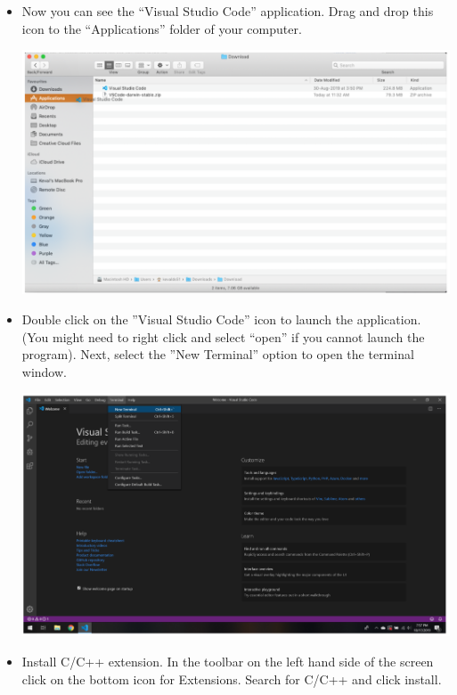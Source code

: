 \begin{itemize}
    \item Now you can see the “Visual Studio Code” application. Drag and drop this icon to the “Applications” folder of your computer. 

    \includegraphics[width=6in]{images/macVSCodeSetup/image4.png}

    \item Double click on the ”Visual Studio Code” icon to launch the application. (You might need to right click and select “open” if you cannot launch the program). Next, select the ”New Terminal” option to open the terminal window.

    \includegraphics[width=6in]{images/macVSCodeSetup/image7.png}

    \item Install C/C++ extension. In the toolbar on the left hand side of the screen click on the bottom icon for Extensions. Search for C/C++ and click install.


\end{itemize}
